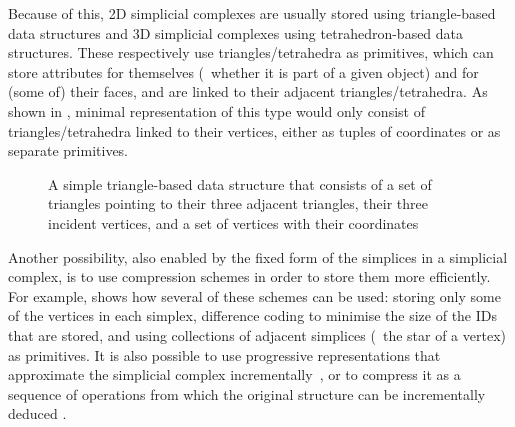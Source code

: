 Because of this, 2D simplicial complexes are usually stored using triangle-based data structures and 3D simplicial complexes using tetrahedron-based data structures.
These respectively use triangles/tetrahedra as primitives, which can store attributes for themselves (\eg\ whether it is part of a given object) and for (some of) their faces, and are linked to their adjacent triangles/tetrahedra.
As shown in , minimal representation of this type would only consist of triangles/tetrahedra linked to their vertices, either as tuples of coordinates or as separate primitives.
\begin{figure}[tbp]
\centering
{}
\quad
{}
\quad
{}
\caption[A triangle-based data structure]{A simple triangle-based data structure that consists of a set of triangles pointing to their three adjacent triangles, their three incident vertices, and a set of vertices with their coordinates}
\label{fig:2-simplex}
\end{figure}

Another possibility, also enabled by the fixed form of the simplices in a simplicial complex, is to use compression schemes in order to store them more efficiently.
For example, \citet{Blandford05} shows how several of these schemes can be used: storing only some of the vertices in each simplex, difference coding to minimise the size of the IDs that are stored, and using collections of adjacent simplices (\eg\ the star of a vertex) as primitives.
It is also possible to use progressive representations that approximate the simplicial complex incrementally~\citep{Popovic97}, or to compress it as a sequence of operations from which the original structure can be incrementally deduced \citep{Rossignac99}.


